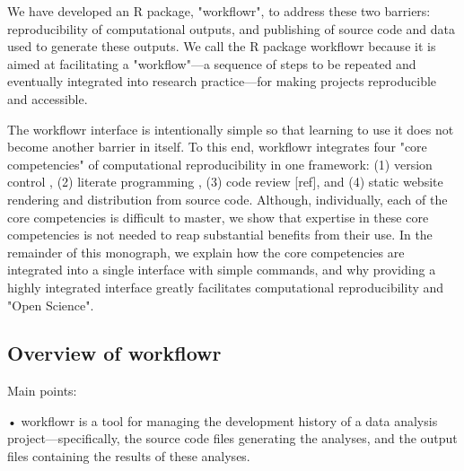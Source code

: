 \documentclass[9pt,a4paper]{extarticle}
\begin{document}
We have developed an R \cite{R2019} package, "workflowr", to address
these two barriers: reproducibility of computational outputs, and
publishing of source code and data used to generate these outputs. We
call the R package workflowr because it is aimed at facilitating a
"workflow"—a sequence of steps to be repeated and eventually integrated
into research practice—for making projects reproducible and accessible.

The workflowr interface is intentionally simple so that learning to use
it does not become another barrier in itself. To this end, workflowr
integrates four "core competencies" of computational reproducibility in
one framework: (1) version control \cite{Loeliger2012, Chacon2014}, (2)
literate programming \cite{Xie2015}, (3) code review [ref], and (4)
static website rendering and distribution from source code. Although,
individually, each of the core competencies is difficult to master, we
show that expertise in these core competencies is not needed to reap
substantial benefits from their use. In the remainder of this monograph,
we explain how the core competencies are integrated into a single
interface with simple commands, and why providing a highly integrated
interface greatly facilitates computational reproducibility and "Open
Science".

\subsection*{Overview of workflowr}

Main points:

• workflowr is a tool for managing the development history of a data
analysis project—specifically, the source code files generating the
analyses, and the output files containing the results of these analyses.
\end{document}
